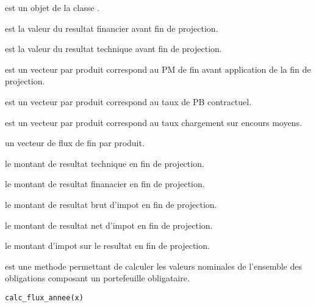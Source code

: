 \documentclass[a4paper]{book}
\begin{document}
%
\begin{Arguments}
\begin{ldescription}
\item[\code{x}] est un objet de la classe .

\item[\code{resultat\_fin}] est la valeur  du resultat financier avant fin de projection.

\item[\code{result\_tech}] est la valeur  du resultat technique avant fin de projection.

\item[\code{pm\_fin\_ap\_pb}] est un vecteur  par produit
correspond au PM de fin avant application de la fin de projection.

\item[\code{tx\_pb}] est un vecteur  par produit
correspond au taux de PB contractuel.

\item[\code{tx\_enc\_moy}] est un vecteur  par produit
correspond au taux chargement sur encours moyens.
\end{ldescription}
\end{Arguments}
%
\begin{Value}
 un vecteur de flux de fin par produit.

 le montant de resultat technique en fin de projection.

 le montant de resultat finanacier en fin de projection.

 le montant de resultat brut d'impot en fin de projection.

 le montant de resultat net d'impot en fin de projection.

 le montant d'impot sur le resultat en fin de projection.
\end{Value}
%
\begin{Description}\relax
{} est une methode permettant de calculer les valeurs nominales de l'ensemble des obligations
composant un portefeuille obligataire.
\end{Description}
%
\begin{Usage}
\begin{verbatim}
calc_flux_annee(x)
\end{verbatim}
\end{Usage}
\end{document}
